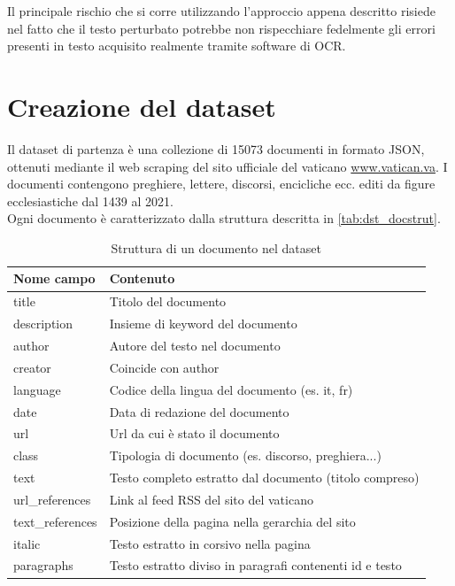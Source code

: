Il principale rischio che si corre utilizzando l'approccio appena descritto risiede nel fatto che il testo perturbato potrebbe non rispecchiare fedelmente gli errori presenti in testo acquisito realmente tramite software di OCR.
\section{Creazione del dataset}
\label{dst:creazione}
Il dataset di partenza è una collezione di 15073 documenti in formato JSON, ottenuti mediante il web scraping del sito ufficiale del vaticano \url{www.vatican.va}. I documenti contengono preghiere, lettere, discorsi, encicliche ecc. editi da figure ecclesiastiche dal 1439 al 2021.\\
Ogni documento è caratterizzato dalla struttura descritta in \autoref{tab:dst_docstrut}.


\begin{table}[H]
\centering
\begin{tabular}{ll}
\textbf{Nome campo} & \textbf{Contenuto} \\ \hline
title & Titolo del documento \\
description & Insieme di keyword del documento\\
author & Autore del testo nel documento \\
creator & Coincide con author \\
language & Codice della lingua del documento (es. it, fr) \\
date & Data di redazione del documento \\
url & Url da cui è stato il documento \\
class & Tipologia di documento (es. discorso, preghiera...)\\
text & Testo completo estratto dal documento (titolo compreso)\\
url\_references & Link al feed RSS del sito del vaticano \\
text\_references & Posizione della pagina nella gerarchia del sito\\
italic & Testo estratto in corsivo nella pagina \\
paragraphs & Testo estratto diviso in paragrafi contenenti id e testo
\end{tabular}
\caption{Struttura di un documento nel dataset}
\label{tab:dst_docstrut}
\end{table}

